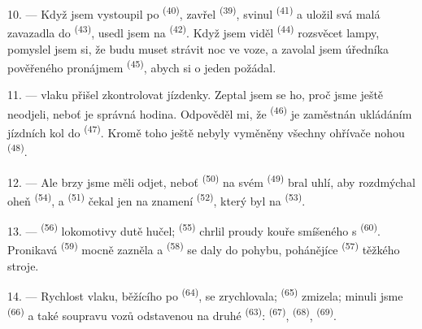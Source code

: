 \VUsaut{3.0mm}

10. --- Když jsem vystoupil po  \textsuperscript{(40)}, zavřel
 \textsuperscript{(39)}, svinul  \textsuperscript{(41)} a
uložil svá malá zavazadla do  \textsuperscript{(43)}, usedl jsem na
 \textsuperscript{(42)}. Když jsem viděl 
\textsuperscript{(44)} rozsvěcet lampy, pomyslel jsem si, že budu muset strávit noc ve
voze, a zavolal jsem úředníka pověřeného pronájmem 
\textsuperscript{(45)}, abych si o jeden požádal.

11. ---  vlaku přišel zkontrolovat jízdenky. Zeptal jsem se ho, proč
jsme ještě neodjeli, neboť je správná hodina. Odpověděl mi, že 
\textsuperscript{(46)} je zaměstnán ukládáním jízdních kol do 
\textsuperscript{(47)}. Kromě toho ještě nebyly vyměněny všechny ohřívače nohou
\textsuperscript{(48)}.

12. --- Ale brzy jsme měli odjet, neboť  \textsuperscript{(50)} na svém
 \textsuperscript{(49)} bral uhlí, aby rozdmýchal oheň
 \textsuperscript{(54)}, a 
\textsuperscript{(51)} čekal jen na znamení 
\textsuperscript{(52)}, který byl na  \textsuperscript{(53)}.

13. ---  \textsuperscript{(56)} lokomotivy dutě hučel; 
\textsuperscript{(55)} chrlil proudy kouře smíšeného s 
\textsuperscript{(60)}. Pronikavá  \textsuperscript{(59)} mocně zazněla
a  \textsuperscript{(58)} se daly do pohybu, pohánějíce 
\textsuperscript{(57)} těžkého stroje.

\VUsaut{3.0mm}
\VUsaut{3.0mm}

14. --- Rychlost vlaku, běžícího po  \textsuperscript{(64)}, se
zrychlovala;  \textsuperscript{(65)} zmizela; minuli jsme
 \textsuperscript{(66)} a také soupravu vozů odstavenou na druhé
 \textsuperscript{(63)}:  \textsuperscript{(67)},
 \textsuperscript{(68)}, 
\textsuperscript{(69)}.


